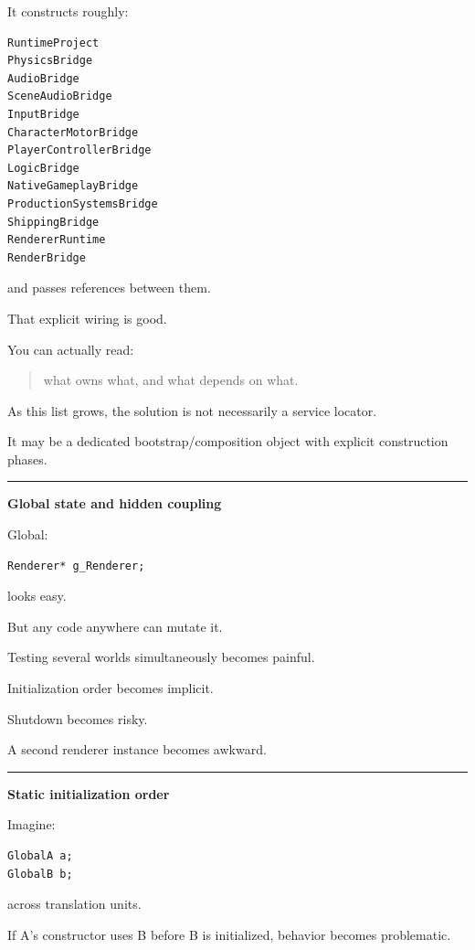 It constructs roughly:

\begin{verbatim}
RuntimeProject
PhysicsBridge
AudioBridge
SceneAudioBridge
InputBridge
CharacterMotorBridge
PlayerControllerBridge
LogicBridge
NativeGameplayBridge
ProductionSystemsBridge
ShippingBridge
RendererRuntime
RenderBridge
\end{verbatim}

and passes references between them.

That explicit wiring is good.

You can actually read:

\begin{quote}
what owns what, and what depends on what.
\end{quote}

As this list grows, the solution is not necessarily a service locator.

It may be a dedicated bootstrap/composition object with explicit construction phases.

\begin{center}\rule{0.5\linewidth}{0.5pt}\end{center}

\textbf{Global state and hidden coupling}

Global:

\begin{verbatim}
Renderer* g_Renderer;
\end{verbatim}

looks easy.

But any code anywhere can mutate it.

Testing several worlds simultaneously becomes painful.

Initialization order becomes implicit.

Shutdown becomes risky.

A second renderer instance becomes awkward.

\begin{center}\rule{0.5\linewidth}{0.5pt}\end{center}

\textbf{Static initialization order}

Imagine:

\begin{verbatim}
GlobalA a;
GlobalB b;
\end{verbatim}

across translation units.

If A's constructor uses B before B is initialized, behavior becomes problematic.

